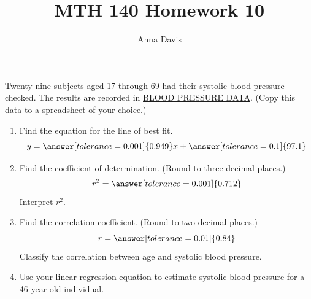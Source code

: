\documentclass{ximera}
\author{Anna Davis} \title{MTH 140 Homework 10}
\begin{document}
\begin{abstract}

\end{abstract}
\maketitle
\begin{problem}\label{prob:140hom10prob1}

Twenty nine subjects aged 17 through 69 had their systolic blood pressure checked.  The results are recorded in \href{https://docs.google.com/spreadsheets/d/1v_i5UPj_IH2-d8QphkCZJiPbK0oV1fd0NAXmLnT8hnE/edit?usp=sharing}{BLOOD PRESSURE DATA}.  (Copy this data to a spreadsheet of your choice.)
\begin{enumerate}
    \item Find the equation for the line of best fit.
    $$y=\answer[tolerance=0.001]{0.949}x+\answer[tolerance=0.1]{97.1}$$
    \item Find the coefficient of determination. (Round to three decimal places.)
    $$r^2=\answer[tolerance=0.001]{0.712}$$
    Interpret $r^2$.
    \begin{multipleChoice} 
\end{multipleChoice} 
    \item Find the correlation coefficient.  (Round to two decimal places.)
    $$r=\answer[tolerance=0.01]{0.84}$$
    Classify the correlation between age and systolic blood pressure.
    
    \begin{multipleChoice} 
\end{multipleChoice}  
\item Use your linear regression equation to estimate systolic blood pressure for a 46 year old individual.  


\end{enumerate}
\end{problem}
\end{document}
